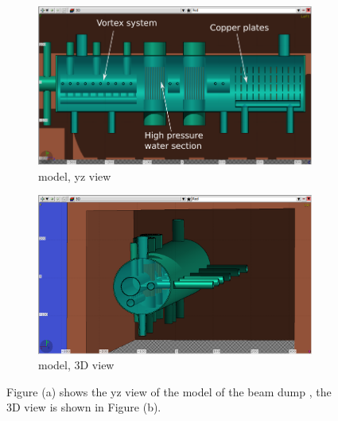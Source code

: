 \begin{figure}[h]
 \centering
  \begin{subfigure}[b]{0.49\textwidth}
   \centering
    \includegraphics[width=\textwidth]{Figures/BeamDump/Design2_geometry_3Dinside3.png}
   \caption{\fluka model, yz view}
   \end{subfigure}
   \hfill
    \begin{subfigure}[b]{0.49\textwidth}
   \centering
    \includegraphics[width=\textwidth]{Figures/BeamDump/Design2_geometry_3Dinside1.png}
   \caption{\fluka model, 3D view}
   \end{subfigure}
   \caption[ILC main beam dump design 2]{Figure (a) shows the yz view of the \fluka model of the beam dump \designtwo, the 3D view is shown in Figure (b).}
   \label{fig:BeamDumps:design2}
 \end{figure}


